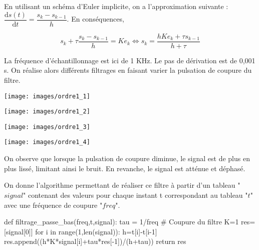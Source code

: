 En utilisant un schéma d'Euler implicite, on a l'approximation suivante : $\dfrac{\text{d} s(t) }{\text{d}t} = \dfrac{s_{k}-s_{k-1}}{h}$. En conséquences, 

$$
s_k+\tau \dfrac{s_{k}-s_{k-1}}{h} = K e_k \Leftrightarrow 
s_k = \dfrac{h K e_k+\tau s_{k-1}}{h+\tau}
$$

La fréquence d'échantillonnage est ici de 1 KHz. Le pas de dérivation est de 0,001 s. On réalise alors différents filtrages en faisant varier la pulsation de coupure du filtre. 

\begin{minipage}[c]{.43\linewidth}
\begin{center}
\texttt{[image: images/ordre1\_1]}
\end{center}
\end{minipage} \hfill
\begin{minipage}[c]{.43\linewidth}
\begin{center}
\texttt{[image: images/ordre1\_2]}
\end{center}
\end{minipage} 

\begin{minipage}[c]{.43\linewidth}
\begin{center}
\texttt{[image: images/ordre1\_3]}
\end{center}
\end{minipage} \hfill
\begin{minipage}[c]{.43\linewidth}
\begin{center}
\texttt{[image: images/ordre1\_4]}
\end{center}
\end{minipage}

On observe que lorsque la pulsation de coupure diminue, le signal est de plus en plus lissé, limitant ainsi le bruit. En revanche, le signal est atténue et déphasé. 




On donne l'algorithme permettant de réaliser ce filtre à partir d'un tableau "$signal$" contenant des valeurs pour chaque instant t correspondant au tableau "$t$" avec une fréquence de coupure "$freq$".

\begin{pyverbatim}
def filtrage_passe_bas(freq,t,signal):
    tau = 1/freq # Coupure du filtre
    K=1
    res=[signal[0]]
    for i in range(1,len(signal)):
        h=t[i]-t[i-1]
        res.append((h*K*signal[i]+tau*res[-1])/(h+tau))
    return res
\end{pyverbatim}

